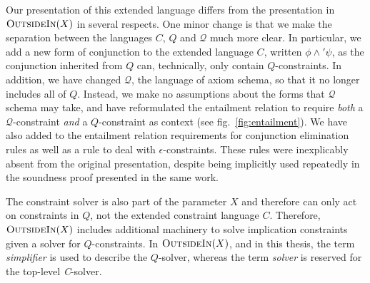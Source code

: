 \documentclass[a4paper]{jfp}
\newcommand{\outsidein}{\textsc{OutsideIn}(X)}
\begin{document}
Our presentation of this extended language differs from the presentation in $\outsidein$ in several respects. One minor change is that we make the
separation between the languages $C$, $Q$ and $\mathcal{Q}$ much more clear. In particular, we add a new form of conjunction to the extended language
$C$, written $\phi \land' \psi$, as the conjunction inherited from $Q$ can, technically, only contain $Q$-constraints. In addition, we have changed
$\mathcal{Q}$, the language of axiom schema, so that it no longer includes all of $Q$. Instead, we make no assumptions about the forms that
$\mathcal{Q}$ schema may take, and have reformulated the entailment relation to require \emph{both} a $\mathcal{Q}$-constraint \emph{and} a
$Q$-constraint as context (see fig.~\ref{fig:entailment}). We have also added to the entailment relation requirements for conjunction elimination
rules as well as a rule to deal with $\epsilon$-constraints. These rules were inexplicably absent from the original presentation, despite being
implicitly used repeatedly in the soundness proof presented in the same work.

The constraint solver is also part of the parameter $X$ and therefore can only act on constraints in $Q$, not the extended constraint language $C$.
Therefore, $\outsidein$ includes additional machinery to solve implication constraints given a solver for $Q$-constraints. In $\outsidein$, and in
this thesis, the term \emph{simplifier} is used to describe the $Q$-solver, whereas the term \emph{solver} is reserved for the top-level
\emph{C}-solver.

\newcommand{\nvdasharrow}[0]{\nvdash\!\!\!\!\blacktriangleright\ }
\newcommand{\vdasharrow}[0]{\vdash\!\!\!\!\blacktriangleright\ }
\end{document}
